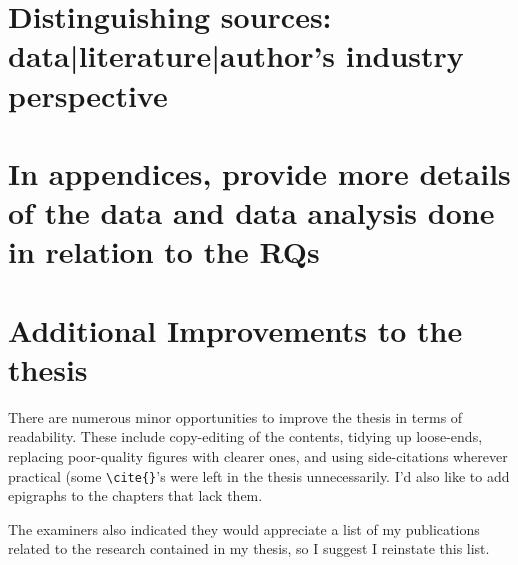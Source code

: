


\section{Distinguishing sources: data|literature|author's industry perspective}


\section{In appendices, provide more details of the data and data analysis done in relation to the RQs}


\section{Additional Improvements to the thesis}
There are numerous minor opportunities to improve the thesis in terms of readability. These include copy-editing of the contents, tidying up loose-ends, replacing poor-quality figures with clearer ones, and using side-citations wherever practical (some \verb+\cite{}+'s were left in the thesis unnecessarily. I'd also like to add epigraphs to the chapters that lack them.

The examiners also indicated they would appreciate a list of my publications related to the research contained in my thesis,  so I suggest I reinstate this list.
